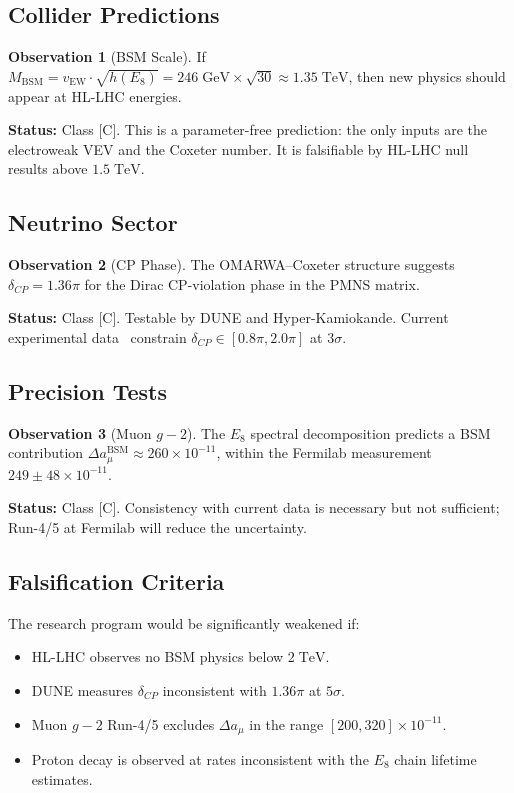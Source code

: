 \documentclass[11pt, a4paper]{article}
\theoremstyle{plain}
\theoremstyle{definition}
\newtheorem{observation}{Observation}[section]
\theoremstyle{remark}
\begin{document}
\subsection{Collider Predictions}

\begin{observation}[BSM Scale]
\label{obs:bsm}
If $M_{\mathrm{BSM}} = v_{\mathrm{EW}} \cdot \sqrt{h(E_8)}
= 246\;\mathrm{GeV} \times \sqrt{30} \approx 1.35\;\mathrm{TeV}$,
then new physics should appear at HL-LHC energies.
\end{observation}

\textbf{Status:} Class [C]. This is a parameter-free prediction: the
only inputs are the electroweak VEV and the Coxeter number. It is
falsifiable by HL-LHC null results above $1.5\;\mathrm{TeV}$.

\subsection{Neutrino Sector}

\begin{observation}[CP Phase]
\label{obs:cp}
The OMARWA--Coxeter structure suggests $\delta_{CP} = 1.36\pi$
for the Dirac CP-violation phase in the PMNS matrix.
\end{observation}

\textbf{Status:} Class [C]. Testable by DUNE and Hyper-Kamiokande.
Current experimental data~\cite{nufit} constrain
$\delta_{CP} \in [0.8\pi, 2.0\pi]$ at $3\sigma$.

\subsection{Precision Tests}

\begin{observation}[Muon $g-2$]
\label{obs:gm2}
The $E_8$ spectral decomposition predicts a BSM contribution
$\Delta a_\mu^{\mathrm{BSM}} \approx 260 \times 10^{-11}$,
within the Fermilab measurement $249 \pm 48 \times 10^{-11}$.
\end{observation}

\textbf{Status:} Class [C]. Consistency with current data is necessary
but not sufficient; Run-4/5 at Fermilab will reduce the uncertainty.

\subsection{Falsification Criteria}

The research program would be significantly weakened if:
\begin{itemize}
  \item HL-LHC observes no BSM physics below $2\;\mathrm{TeV}$.
  \item DUNE measures $\delta_{CP}$ inconsistent with $1.36\pi$ at
    $5\sigma$.
  \item Muon $g-2$ Run-4/5 excludes $\Delta a_\mu$ in the range
    $[200, 320] \times 10^{-11}$.
  \item Proton decay is observed at rates inconsistent with the
    $E_8$ chain lifetime estimates.
\end{itemize}
\end{document}
